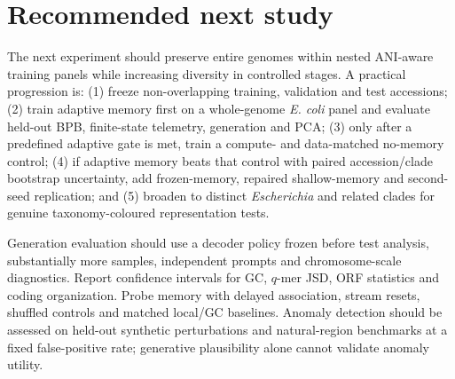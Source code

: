 \documentclass[10pt,twocolumn]{article}
\begin{document}
\section*{Recommended next study}
The next experiment should preserve entire genomes within nested ANI-aware training panels while increasing diversity in controlled stages. A practical progression is: (1) freeze non-overlapping training, validation and test accessions; (2) train adaptive memory first on a whole-genome \textit{E. coli} panel and evaluate held-out BPB, finite-state telemetry, generation and PCA; (3) only after a predefined adaptive gate is met, train a compute- and data-matched no-memory control; (4) if adaptive memory beats that control with paired accession/clade bootstrap uncertainty, add frozen-memory, repaired shallow-memory and second-seed replication; and (5) broaden to distinct \textit{Escherichia} and related clades for genuine taxonomy-coloured representation tests.

Generation evaluation should use a decoder policy frozen before test analysis, substantially more samples, independent prompts and chromosome-scale diagnostics. Report confidence intervals for GC, $q$-mer JSD, ORF statistics and coding organization. Probe memory with delayed association, stream resets, shuffled controls and matched local/GC baselines. Anomaly detection should be assessed on held-out synthetic perturbations and natural-region benchmarks at a fixed false-positive rate; generative plausibility alone cannot validate anomaly utility.
\end{document}
